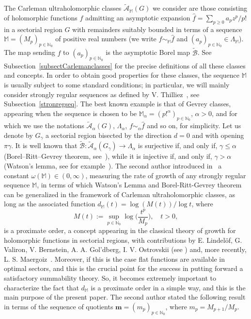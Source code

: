 \documentclass[11pt,a4paper]{article}
\theoremstyle{definition}
\def\a{\alpha}
\def\ga{\gamma}
\def\N{\mathbb{N}}
\def\M{\mathbb{M}}
\def\bM{\mathbb{M}}%
\def\bm{\boldsymbol{m}}
\begin{document}
The Carleman ultraholomorphic classes $\tilde{\mathcal{A}}_{\M}(G)$ we consider are those consisting of holomorphic functions $f$ admitting an asymptotic expansion $\hat f=\sum_{p\ge 0}a_pz^p/p!$ in a sectorial region $G$ with remainders suitably bounded in terms of a sequence $\M=(M_p)_{p\in\N_0}$ of positive real numbers (we write $f\sim_{\M}\hat f$ and $(a_p)_{p\in\N_0}\in\Lambda_{\M}$). The map sending $f$ to $(a_p)_{p\in\N_0}$ is the asymptotic Borel map $\tilde{\mathcal{B}}$.
See Subsection~\ref{subsectCarlemanclasses} for the precise definitions of all these classes and concepts.
In order to obtain good properties for these classes, the sequence $\M$ is usually subject to some standard conditions; in particular, we will mainly consider strongly regular sequences as defined by V. Thilliez~\cite{thilliez}, see Subsection~\ref{stronregseq}.
The best known example is that of Gevrey classes, appearing when the sequence is chosen to be $\bM_{\a}=(p!^{\a})_{p\in\N_{0}}$, $\a>0$,
and for which we use the notations $\tilde{\mathcal{A}}_{\a}(G)$, $\Lambda_{\a}$, $f\sim_{\a}\hat{f}$ and so on, for simplicity.
Let us denote by $G_\ga$ a sectorial region bisected by the direction $d=0$ and with opening $\pi\ga$. It is well known that $\tilde{\mathcal{B}}:\tilde{\mathcal{A}}_{\a}(G_\ga)\to\Lambda_{\a}$ is surjective if, and only if, $\ga\le\a$ (Borel--Ritt--Gevrey theorem, see~\cite{Ramis1,Ramis2}),
while it is injective 
if, and only if, $\ga>\a$ (Watson's lemma, see for example~\cite[Prop.\ 11]{Balserutx}).
The second author introduced in~\cite{SanzFlat} a constant $\omega(\M)\in(0,\infty)$, measuring the rate of growth of any strongly regular sequence $\M$,
in terms of which Watson's Lemma and Borel-Ritt-Gevrey theorem can be generalized in the framework of Carleman ultraholomorphic classes, as long as the associated function $d_{\M}(t)=\log(M(t))/\log t$, where
\begin{equation*}
M(t):=\sup_{p\in\N_{0}}\log\big(\frac{t^p}{M_{p}}\big)%
,\quad t>0%
,
\end{equation*}
is a proximate order, a concept appearing in the classical theory of growth for holomorphic functions in sectorial regions, with contributions by E. Lindel\"of, G. Valiron, V. Bernstein, A. A. Gol'dberg, I. V. Ostrovskii (see \cite{Valiron42,Levin,GoldbergOstrowskii}) and, more recently, L. S. Maergoiz~\cite{Maergoiz}. Moreover, if this is the case flat functions are available in optimal sectors, and this is the crucial point for the success in putting forward a satisfactory summability theory. So, it becomes extremely important to characterize the fact that $d_{\M}$ is a proximate order in a simple way, and this is the main purpose of the present paper. The second author stated the following result in terms of the sequence of quotients $\bm=(m_p)_{p\in\N_0}$, where $m_p=M_{p+1}/M_p$.
\end{document}
